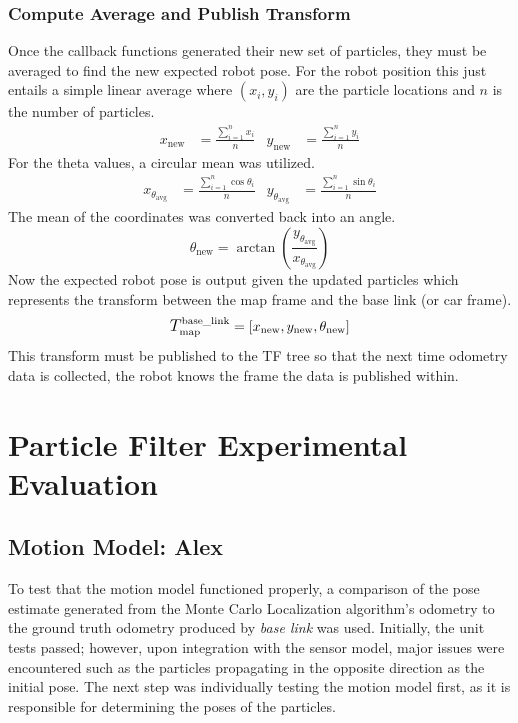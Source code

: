 \documentclass{article}
\begin{document}
\subsubsection{Compute Average and Publish Transform}
Once the callback functions generated their new set of particles, they must be averaged to find the new expected robot pose. For the robot position this just entails a simple linear average where $(x_i, y_i)$ are the particle locations and $n$ is the number of particles.
\begin{align*}
    x_{\text{new}} &= \frac{\sum_{i=1}^{n} x_i}{n} &
    y_{\text{new}} &= \frac{\sum_{i=1}^{n} y_i}{n}
\end{align*}
For the theta values, a circular mean was utilized.
\begin{align*}
    x_{\theta_{\text{avg}}} &= \frac{\sum_{i=1}^{n} \cos{\theta_{i}}}{n} &
    y_{\theta_{\text{avg}}} &= \frac{\sum_{i=1}^{n} \sin{\theta_{i}}}{n}
\end{align*}
The mean of the coordinates was converted back into an angle.
\begin{equation*}
    \theta_{\text{new}} = \arctan\left(\frac{y_{\theta_{\text{avg}}}}{x_{\theta_{\text{avg}}}}\right)
\end{equation*}
Now the expected robot pose is output given the updated particles which represents the transform between the map frame and the base link (or car frame).
\begin{equation*}
    \mathlarger{T}_{\text{map}}^{\text{base\_link}} = [x_{\text{new}}, y_{\text{new}}, \theta_{\text{new}}]
\end{equation*}
This transform must be published to the TF tree so that the next time odometry data is collected, the robot knows the frame the data is published within.


\section{Particle Filter Experimental Evaluation}

\subsection{Motion Model: Alex}
To test that the motion model functioned properly, a comparison of the pose estimate generated from the Monte Carlo Localization algorithm's odometry to the ground truth odometry produced by \textit{base link} was used. Initially, the unit tests passed; however, upon integration with the sensor model, major issues were encountered such as the particles propagating in the opposite direction as the initial pose. The next step was individually testing the motion model first, as it is responsible for determining the poses of the particles. 
\end{document}
